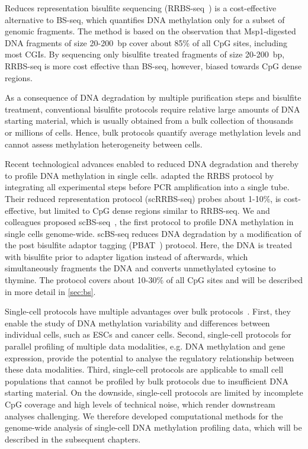 Reduces representation bisulfite sequencing (RRBS-seq~\citep{meissner_genome-scale_2008-1,smith_high-throughput_2009}) is a cost-effective alternative to BS-seq, which quantifies DNA methylation only for a subset of genomic fragments. The method is based on the observation that Msp1-digested DNA fragments of size 20-200~bp cover about 85\% of all CpG sites, including most CGIs. By sequencing only bisulfite treated fragments of size 20-200~bp, RRBS-seq is more cost effective than BS-seq, however, biased towards CpG dense regions.

As a consequence of DNA degradation by multiple purification steps and bisulfite treatment, conventional bisulfite protocols require relative large amounts of DNA starting material, which is usually obtained from a bulk collection of thousands or millions of cells. Hence, bulk protocols quantify average methylation levels and cannot assess methylation heterogeneity between cells.

Recent technological advances enabled to reduced DNA degradation and thereby to profile DNA methylation in single cells. \citet{guo_profiling_2015} adapted the RRBS protocol by integrating all experimental steps before PCR amplification into a single tube. Their reduced representation protocol (scRRBS-seq) probes about 1-10\%, is cost-effective, but limited to CpG dense regions similar to RRBS-seq. We and colleagues proposed scBS-seq~\citep{smallwood_single-cell_2014}, the first protocol to profile DNA methylation in single cells genome-wide. scBS-seq reduces DNA degradation by a modification of the post bisulfite adaptor tagging (PBAT~\citep{miura_amplification-free_2012-1}) protocol. Here, the DNA is treated with bisulfite prior to adapter ligation instead of afterwards, which simultaneously fragments the DNA and converts unmethylated cytosine to thymine. The protocol covers about 10-30\% of all CpG sites and will be described in more detail in \cref{sec:bs}.

Single-cell protocols have multiple advantages over bulk protocols~\citep{schwartzman_single-cell_2015}. First, they enable the study of DNA methylation variability and differences between individual cells, such as ESCs and cancer cells. Second, single-cell protocols for parallel profiling of multiple data modalities, e.g. DNA methylation and gene expression, provide the potential to analyse the regulatory relationship between these data modalities. Third, single-cell protocols are applicable to small cell populations that cannot be profiled by bulk protocols due to insufficient DNA starting material. On the downside, single-cell protocols are limited by incomplete CpG coverage and high levels of technical noise, which render downstream analyses challenging. We therefore developed computational methods for the genome-wide analysis of single-cell DNA methylation profiling data, which will be described in the subsequent chapters.

